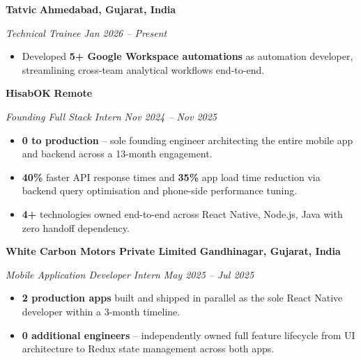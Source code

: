 
\noindent \textbf{Tatvic} \hfill \textbf{Ahmedabad, Gujarat, India}\par
\noindent \textit{Technical Trainee} \hfill \textit{Jan 2026 -- Present}\par
\begin{itemize}
  \item Developed \textbf{5+ Google Workspace automations} as automation developer, streamlining cross-team analytical workflows end-to-end.
\end{itemize}
\vspace{4pt}

\noindent \textbf{HisabOK} \hfill \textbf{Remote}\par
\noindent \textit{Founding Full Stack Intern} \hfill \textit{Nov 2024 -- Nov 2025}\par
\begin{itemize}
  \item \textbf{0 to production} -- sole founding engineer architecting the entire mobile app and backend across a 13-month engagement.
  \item \textbf{40\%} faster API response times and \textbf{35\%} app load time reduction via backend query optimisation and phone-side performance tuning.
  \item \textbf{4+} technologies owned end-to-end across React Native, Node.js, Java with zero handoff dependency.
\end{itemize}
\vspace{4pt}

\noindent \textbf{White Carbon Motors Private Limited} \hfill \textbf{Gandhinagar, Gujarat, India}\par
\noindent \textit{Mobile Application Developer Intern} \hfill \textit{May 2025 -- Jul 2025}\par
\begin{itemize}
  \item \textbf{2 production apps} built and shipped in parallel as the sole React Native developer within a 3-month timeline.
  \item \textbf{0 additional engineers} -- independently owned full feature lifecycle from UI architecture to Redux state management across both apps.
\end{itemize}
